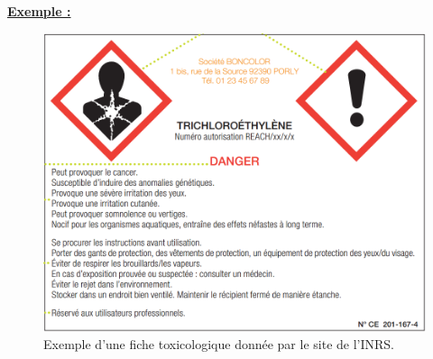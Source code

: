 \underline{\textbf{Exemple :}}
\begin{figure}[!h]
    \centering
    \includegraphics[scale=0.7]{Cours/Exemple_fiche_toxico.png}
    \caption{Exemple d'une fiche toxicologique donnée par le site de l'INRS.}
    \label{fig:enter-label}
\end{figure}